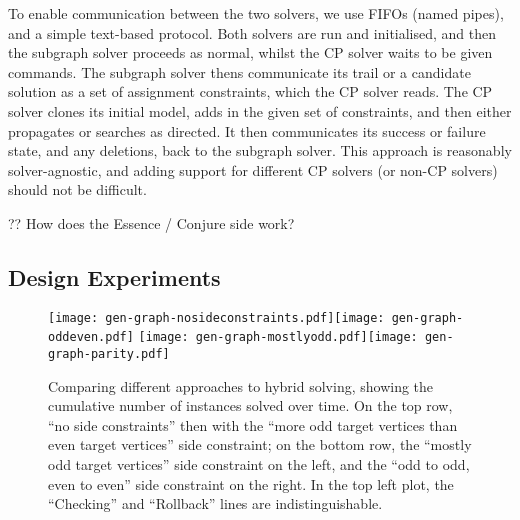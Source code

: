 \documentclass[runningheads]{llncs}
\begin{document}
To enable communication between the two solvers, we use FIFOs (named pipes), and a simple text-based
protocol.  Both solvers are run and initialised, and then the subgraph solver proceeds as normal,
whilst the CP solver waits to be given commands. The subgraph solver thens communicate its trail
or a candidate solution as a set of assignment constraints, which the CP solver reads. The CP solver
clones its initial model, adds in the given set of constraints, and then either propagates or
searches as directed. It then communicates its success or failure state, and any deletions, back to
the subgraph solver. This approach is reasonably solver-agnostic, and adding support for different
CP solvers (or non-CP solvers) should not be difficult.

?? How does the Essence / Conjure side work?

\subsection{Design Experiments}

\begin{figure}[p]
    \texttt{[image: gen-graph-nosideconstraints.pdf]}\hfill\texttt{[image: gen-graph-oddeven.pdf]}
    \bigskip
    \texttt{[image: gen-graph-mostlyodd.pdf]}\hfill\texttt{[image: gen-graph-parity.pdf]}
    \caption{Comparing different approaches to hybrid solving, showing the cumulative number of
    instances solved over time. On the top row, ``no side constraints'' then with the ``more odd
    target vertices than even target vertices'' side constraint; on the bottom row, the ``mostly odd
    target vertices'' side constraint on the left, and the ``odd to odd, even to even'' side
    constraint on the right. In the top left plot, the ``Checking'' and ``Rollback'' lines are
    indistinguishable.}\label{figure:cumulative}
\end{figure}
\end{document}

